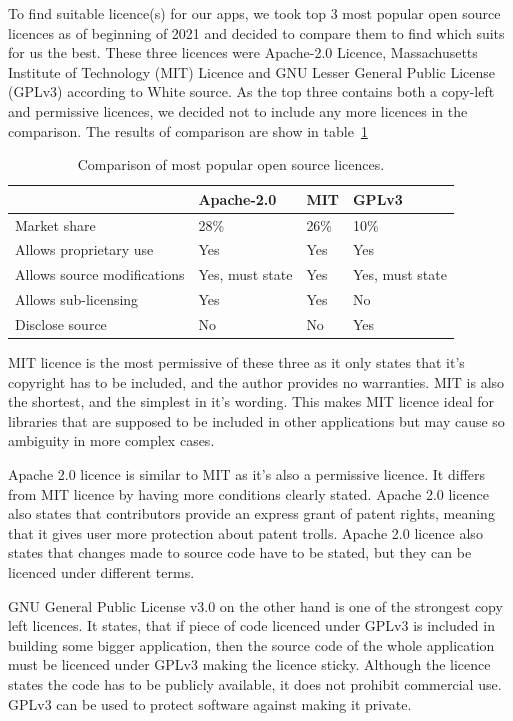 To find suitable licence(s) for our apps, we took top 3 most popular open source licences as of beginning of 2021 and decided
to compare them to find which suits for us the best.
These three licences were Apache-2.0 Licence, Massachusetts Institute of Technology (MIT) Licence and GNU Lesser General Public License (GPLv3) according to White source.
As the top three contains both a copy-left and permissive licences, we decided not to include any more licences in the comparison.
\cite{open-source-licences}
The results of comparison are show in table~\ref{tab:open-source-licence-comparison}
\begin{table}[H]
    \centering
    \begin{tabular}{ | p{4cm} | p{2cm} | p{2cm} | p{2cm} |}
        \hline
         & Apache-2.0 & MIT & GPLv3\\
        \hline
        Market share & 28\% & 26\% & 10\% \\
        \hline
        Allows proprietary use & Yes & Yes & Yes\\
        \hline
        Allows source modifications & Yes, must state & Yes & Yes, must state\\
        \hline
        Allows sub-licensing & Yes & Yes & No\\
        \hline
        Disclose source & No & No & Yes\\
        \hline
    \end{tabular}
    \caption{Comparison of most popular open source licences.}
    \label{tab:open-source-licence-comparison}
\end{table}

MIT licence is the most permissive of these three as it only states that it's copyright has to be included, and
the author provides no warranties.
MIT is also the shortest, and the simplest in it's wording.
This makes MIT licence ideal for libraries that are supposed to be included in other applications but may cause
so ambiguity in more complex cases.
\cite{mit-licences}

Apache 2.0 licence is similar to MIT as it's also a permissive licence.
It differs from MIT licence by having more conditions clearly stated.
Apache 2.0 licence also states that contributors provide an express grant of patent rights, meaning that it gives
user more protection about patent trolls.
Apache 2.0 licence also states that changes made to source code have to be stated, but they can be licenced under different terms.
\cite{apache-2-licences}

GNU General Public License v3.0 on the other hand is one of the strongest copy left licences.
It states, that if piece of code licenced under GPLv3 is included in building some bigger application,
then the source code of the whole application must be licenced under GPLv3 making the licence sticky.
Although the licence states the code has to be publicly available, it does not prohibit commercial use.
GPLv3 can be used to protect software against making it private.
\cite{gplv3-licence}

